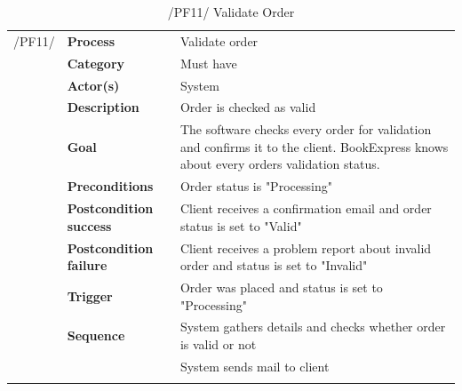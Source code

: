 \documentclass[11pt,a4paper,oneside,svgnames]{report}
\begin{document}
\begin{table}[H]
\centering
\begin{tabular}{p{1.5cm}p{3cm}p{8cm}}
\cellcolor{white}	 /PF11/	& \textbf{Process} & Validate order\\ 
\cellcolor{white}		& \textbf{Category} & Must have\\
\cellcolor{white}		& \textbf{Actor(s)} & System\\ 
\cellcolor{white}		& \textbf{Description}	 & Order is checked as valid\\ 
\cellcolor{white}		& \textbf{Goal} & The software checks every order for validation and confirms it to the client. BookExpress knows about every orders validation status.\\
\cellcolor{white}		& \textbf{Preconditions} & Order status is "Processing"\\
\cellcolor{white}		& \textbf{Postcondition success} & Client receives a confirmation email and order status is set to "Valid"\\
\cellcolor{white}		& \textbf{Postcondition failure} & Client receives a problem report about invalid order and status is set to "Invalid"\\
\cellcolor{white}		& \textbf{Trigger} & Order was placed and status is set to "Processing"\\
\cellcolor{white}		& \textbf{Sequence} & System  gathers details and checks whether order is valid or not\\
\cellcolor{white}		& & System sends mail to client\\
\cellcolor{white}\hfill \\
\end{tabular}
\caption{/PF11/ Validate Order}
\label{tab:pf11}
\end{table}
\end{document}
